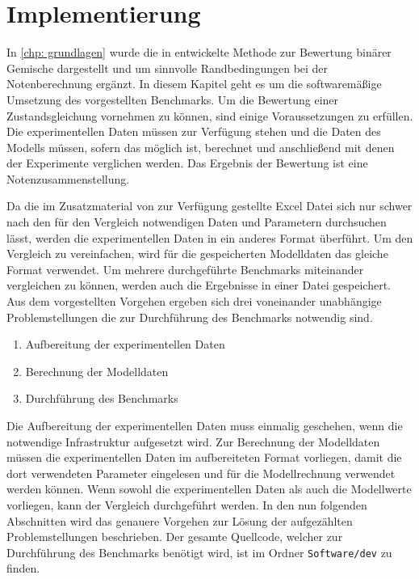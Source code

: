 \documentclass[../thesis.tex]{subfiles}
\begin{document}
\chapter{Implementierung}
\label{chp: implementierung}
In \autoref{chp: grundlagen} wurde die in \cite{jaubert2020benchmark} entwickelte Methode zur Bewertung binärer Gemische dargestellt und um sinnvolle Randbedingungen bei der Notenberechnung ergänzt. In diesem Kapitel geht es um die softwaremäßige Umsetzung des vorgestellten Benchmarks.
Um die Bewertung einer Zustandsgleichung vornehmen zu können, sind einige Voraussetzungen zu erfüllen. Die experimentellen Daten müssen zur Verfügung stehen und die Daten des Modells müssen, sofern das möglich ist, berechnet und anschließend mit denen der Experimente verglichen werden. Das Ergebnis der Bewertung ist eine Notenzusammenstellung.

Da die im Zusatzmaterial von \cite{jaubert2020benchmark} zur Verfügung gestellte Excel Datei sich nur schwer nach den für den Vergleich notwendigen Daten und Parametern durchsuchen lässt, werden die experimentellen Daten in ein anderes Format überführt. Um den Vergleich zu vereinfachen, wird für die gespeicherten Modelldaten das gleiche Format verwendet. Um mehrere durchgeführte Benchmarks miteinander vergleichen zu können, werden auch die Ergebnisse in einer Datei gespeichert. Aus dem vorgestellten Vorgehen ergeben sich drei voneinander unabhängige Problemstellungen die zur Durchführung des Benchmarks notwendig sind.

\begin{enumerate}
	\item Aufbereitung der experimentellen Daten
	\item Berechnung der Modelldaten
	\item Durchführung des Benchmarks
\end{enumerate}

Die Aufbereitung der experimentellen Daten muss einmalig geschehen, wenn die notwendige Infrastruktur aufgesetzt wird. Zur Berechnung der Modelldaten müssen die experimentellen Daten im aufbereiteten Format vorliegen, damit die dort verwendeten Parameter eingelesen und für die Modellrechnung verwendet werden können. Wenn sowohl die experimentellen Daten als auch die Modellwerte vorliegen, kann der Vergleich durchgeführt werden. In den nun folgenden Abschnitten wird das genauere Vorgehen zur Lösung der aufgezählten Problemstellungen beschrieben. Der gesamte Quellcode, welcher zur Durchführung des Benchmarks benötigt wird, ist im Ordner \texttt{Software/dev} zu finden. 
\end{document}
